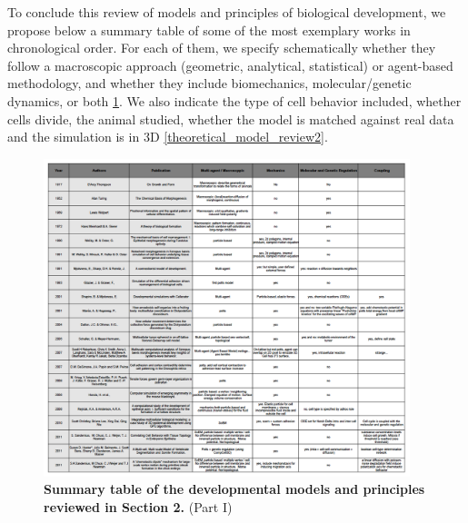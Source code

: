   To conclude this review of models and principles of biological development, we propose below a summary table of some of the most exemplary works in chronological order. For each of them, we specify schematically whether they follow a macroscopic approach (geometric, analytical, statistical) or agent-based methodology, and whether they include biomechanics, molecular/genetic dynamics, or both \ref{theoretical_model_review1}. We also indicate the type of cell behavior included, whether cells divide, the animal studied, whether the model is matched against real data and the simulation is in 3D \ref{theoretical_model_review2}. 
\begin{figure}
\begin{center}
\includegraphics[width=0.95\textwidth]{../../images/Development_Review/theoretical_model/review3_part1.png}
\end{center}
\caption{\textbf{Summary table of the developmental models and principles reviewed in Section 2.} (Part I)}
\label{theoretical_model_review1}
\end{figure}
